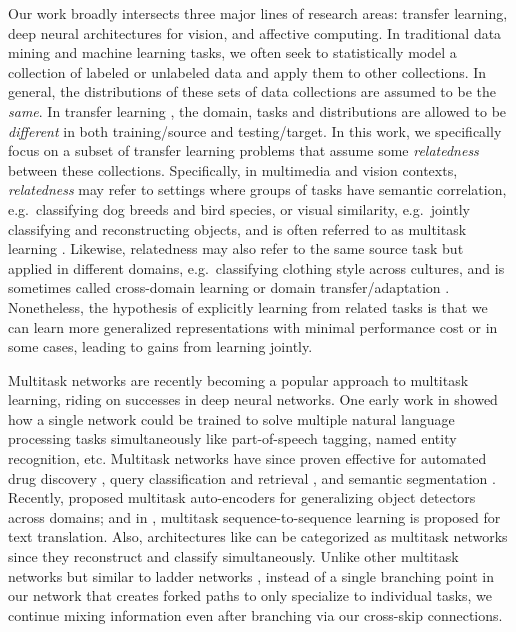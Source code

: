 \documentclass{sig-alternate-05-2015}
\begin{document}
Our work broadly intersects three major lines of research areas: transfer learning, deep neural architectures for vision, and affective computing.
In traditional data mining and machine learning tasks, we often seek to statistically model a collection of labeled or unlabeled data and apply them to other collections.
In general, the distributions of these sets of data collections are assumed to be the \emph{same}.
In transfer learning \cite{pan_2010}, the domain, tasks and distributions are allowed to be \emph{different} in both training/source and testing/target.
In this work, we specifically focus on a subset of transfer learning problems that assume some \emph{relatedness} between these collections.
Specifically, in multimedia and vision contexts, \emph{relatedness} may refer to settings where groups of tasks have semantic correlation, e.g.~classifying dog breeds and bird species, or visual similarity, e.g.~jointly classifying and reconstructing objects, and is often referred to as multitask learning \cite{caruana_1997}.
Likewise, relatedness may also refer to the same source task but applied in different domains, e.g.~classifying clothing style across cultures, and is sometimes called cross-domain learning \cite{jiang_2008} or domain transfer/adaptation \cite{glorot_2011,jiang_2009}.
Nonetheless, the hypothesis of explicitly learning from related tasks is that we can learn more generalized representations with minimal performance cost or in some cases, leading to gains from learning jointly.

Multitask networks are recently becoming a popular approach to multitask learning, riding on successes in deep neural networks.
One early work in \cite{collobert_2008} showed how a single network could be trained to solve multiple natural language processing tasks simultaneously like part-of-speech tagging, named entity recognition, etc.
Multitask networks have since proven effective for automated drug discovery \cite{dahl_2014,ramsundar_2015}, query classification and retrieval \cite{liu_2015}, and semantic segmentation \cite{dai_2016}.
Recently, \cite{ghifary_2015} proposed multitask auto-encoders for generalizing object detectors across domains; and in \cite{luong_2016}, multitask sequence-to-sequence learning is proposed for text translation.
Also, architectures like \cite{ramus_2015,yim_2015} can be categorized as multitask networks since they reconstruct and classify simultaneously.
Unlike other multitask networks but similar to ladder networks \cite{ramus_2015}, instead of a single branching point in our network that creates forked paths to only specialize to individual tasks, we continue mixing information even after branching via our cross-skip connections.
\end{document}
